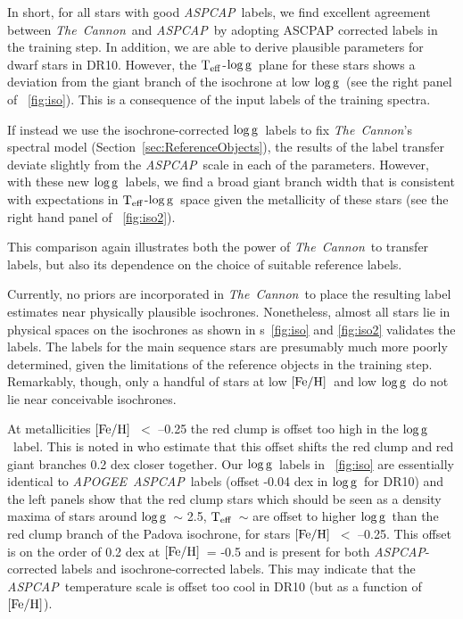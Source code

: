 \documentclass[12pt, preprint]{aastex}
\newcommand{\sectionname}{Section}
\newcommand{\figurenames}{\figurename s}
\newcommand{\tc}{\textsl{The~Cannon}}
\newcommand{\apogee}{\textsl{APOGEE}}
\newcommand{\aspcap}{\textsl{ASPCAP}}
\newcommand{\teff}{\mbox{$\rm T_{eff}$}}
\newcommand{\feh}{\mbox{$\rm [Fe/H]$}}
\newcommand{\logg}{\mbox{$\rm \log g$}}
\begin{document}
In short, for all stars with good \aspcap\ labels, we find excellent agreement between \tc\ and \aspcap\ by adopting ASCPAP corrected labels in the training step.
In addition, we are able to derive plausible parameters for dwarf stars in DR10. However, the \teff-\logg\ plane for these stars shows a deviation from the giant branch of the isochrone at low \logg\ (see the right panel of \figurename~\ref{fig:iso}). This is a consequence of the input labels of the training spectra. 

If instead we use the isochrone-corrected \logg\ labels to fix \tc 's spectral model
(\sectionname~\ref{sec:ReferenceObjects}), the results of the label transfer deviate slightly from the \aspcap\ scale in each of the parameters. 
However, with these new \logg\ labels, we find a broad giant branch width that is consistent with expectations in \teff-\logg\ space 
given the metallicity of these stars (see the right hand panel of \figurename~\ref{fig:iso2}). 

This comparison again illustrates both the power of \tc\ to transfer labels, but also its dependence on the choice of suitable reference labels. 

Currently, no priors are incorporated in \tc\ to place the resulting label estimates near physically plausible isochrones. 
Nonetheless, almost all stars lie in physical spaces on the isochrones as shown in \figurenames~\ref{fig:iso} and \ref{fig:iso2} validates the labels. 
The labels for the main sequence stars are presumably much more poorly determined, given the limitations of the reference objects in the training step. 
Remarkably, though, only a handful of stars at low \feh\ and low \logg\ do not lie near conceivable isochrones. 

At metallicities \feh\ $<$ --0.25 the red clump is offset too high in the \logg\ label. This is noted in \citet{bovy2014} who estimate that this offset shifts the red clump and red giant branches 0.2 dex closer together. 
Our \logg\ labels in \figurename~\ref{fig:iso} are essentially identical to \apogee\ \aspcap\ labels (offset -0.04 dex in \logg\ for DR10) and the left panels show that the red clump stars which should be seen as a density maxima of stars around \logg\ $\sim$ 2.5, \teff\ $\sim$ 
are offset to higher \logg\ than the red clump branch of the Padova isochrone, for stars \feh\ $<$ --0.25. 
This offset is on the order of 0.2 dex at \feh\ = -0.5 and is present for both \aspcap-corrected labels and isochrone-corrected labels. 
This may indicate that the \aspcap\ temperature scale is offset too cool in DR10 (but as a function of \feh).
\end{document}
